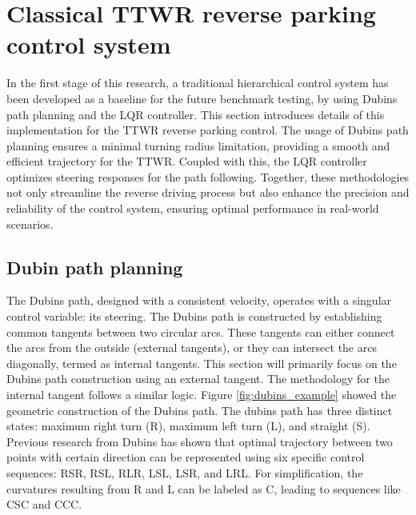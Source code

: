\chapter{\leavevmode\newline Classical TTWR reverse parking control system}
\label{chap:Chapter_5}

In the first stage of this research, a traditional hierarchical control system has been developed as a baseline for the future benchmark testing, by using Dubins path planning and the LQR controller. This section introduces details of this implementation for the TTWR reverse parking control. The usage of Dubins path planning ensures a minimal turning radius limitation, providing a smooth and efficient trajectory for the TTWR. Coupled with this, the LQR controller optimizes steering responses for the path following. Together, these methodologies not only streamline the reverse driving process but also enhance the precision and reliability of the control system, ensuring optimal performance in real-world scenarios.

\section{Dubin path planning}
The Dubins path, designed with a consistent velocity, operates with a singular control variable: its steering. The Dubins path is constructed by establishing common tangents between two circular arcs. These tangents can either connect the arcs from the outside (external tangents), or they can intersect the arcs diagonally, termed as internal tangents. This section will primarily focus on the Dubins path construction using an external tangent. The methodology for the internal tangent follows a similar logic. Figure \ref{fig:dubins_example} showed the geometric construction of the Dubins path. The dubins path has three distinct states: maximum right turn (R), maximum left turn (L), and straight (S). Previous research from Dubins \parencite{dubins1957curves} has shown that optimal trajectory between two points with certain direction can be represented using six specific control sequences: RSR, RSL, RLR, LSL, LSR, and LRL. For simplification, the curvatures resulting from R and L can be labeled as C, leading to sequences like CSC and CCC. 

